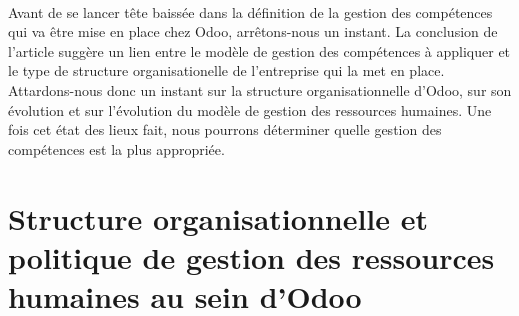 \paragraph{}Avant de se lancer tête baissée dans la définition de la gestion des compétences qui va être mise en place chez Odoo, arrêtons-nous un instant. La conclusion de l'article\citep{delobbe} suggère un lien entre le modèle de gestion des compétences à appliquer et le type de structure organisationelle de l'entreprise qui la met en place. Attardons-nous donc un instant sur la structure organisationnelle d'Odoo, sur son évolution et sur l'évolution du modèle de gestion des ressources humaines. Une fois cet état des lieux fait, nous pourrons déterminer quelle gestion des compétences est la plus appropriée.
        



\section{Structure organisationnelle et politique de gestion des ressources humaines au sein d'Odoo}
